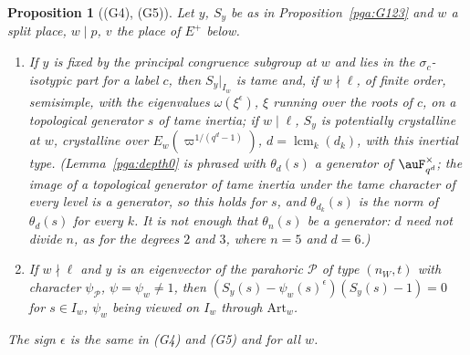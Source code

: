 \documentclass[10pt]{amsart}
\newtheorem{proposition}[theorem]{Proposition}
\theoremstyle{definition}
\theoremstyle{remark}
\begin{document}
\begin{proposition}[(G4), (G5)]\label{pga:G45}
Let $y$, $S_y$ be as in Proposition~\ref{pga:G123} and $w$ a split
place, $w\mid p$, $v$ the place of $E^+$ below.
\begin{enumerate}
\item[(G4)] If $y$ is fixed by the principal congruence subgroup at $w$ and lies in the
$\sigma_c$-isotypic part for a label $c$, then $S_y|_{I_w}$ is tame and, if $w\nmid\ell$, of finite
order, semisimple, with the eigenvalues $\omega(\xi^{\epsilon})$, $\xi$ running over the roots of
$c$, on a topological generator $s$ of tame inertia; if $w\mid\ell$, $S_y$ is
potentially crystalline at $w$, crystalline over $E_w(\varpi^{1/(q^d-1)})$, $d=\operatorname{lcm}_k(d_k)$,
with this inertial type. (Lemma~\ref{pga:depth0} is phrased with $\theta_d(s)$ a generator of $\auF_{q^d}^\times$; the image of a topological generator of tame inertia
under the tame character of every level is a generator, so this holds for $s$, and $\theta_{d_k}(s)$ is the norm of $\theta_d(s)$ for every $k$. It is not enough that $\theta_n(s)$ be a generator:
$d$ need not divide $n$, as for the degrees $2$ and $3$, where $n=5$ and $d=6$.)
\item[(G5)] If $w\nmid\ell$ and $y$ is an eigenvector of the parahoric $\mathcal P$ of type
$(n_W,t)$ with character $\psi_{\mathcal P}$, $\psi=\psi_w\ne1$, then $(S_y(s)-\psi_w(s)^{
\epsilon})(S_y(s)-1)=0$ for $s\in I_w$, $\psi_w$ being viewed on $I_w$ through $\mathrm{Art}_w$.
\end{enumerate}
The sign $\epsilon$ is the same in (G4) and (G5) and for all $w$.
\end{proposition}
\end{document}
